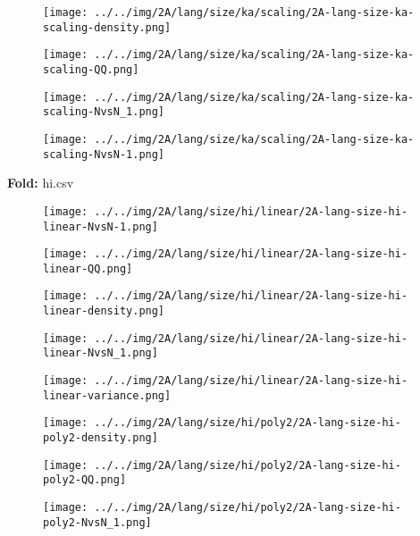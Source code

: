 \begin{figure}[H]
\centering	\texttt{[image: ../../img/2A/lang/size/ka/scaling/2A-lang-size-ka-scaling-density.png]}
\end{figure}
\begin{figure}[H]
\centering	\texttt{[image: ../../img/2A/lang/size/ka/scaling/2A-lang-size-ka-scaling-QQ.png]}
\end{figure}
\begin{figure}[H]
\centering	\texttt{[image: ../../img/2A/lang/size/ka/scaling/2A-lang-size-ka-scaling-NvsN\_1.png]}
\end{figure}
\begin{figure}[H]
\centering	\texttt{[image: ../../img/2A/lang/size/ka/scaling/2A-lang-size-ka-scaling-NvsN-1.png]}
\end{figure}
\textbf{Fold:} hi.csv
\begin{figure}[H]
\centering	\texttt{[image: ../../img/2A/lang/size/hi/linear/2A-lang-size-hi-linear-NvsN-1.png]}
\end{figure}
\begin{figure}[H]
\centering	\texttt{[image: ../../img/2A/lang/size/hi/linear/2A-lang-size-hi-linear-QQ.png]}
\end{figure}
\begin{figure}[H]
\centering	\texttt{[image: ../../img/2A/lang/size/hi/linear/2A-lang-size-hi-linear-density.png]}
\end{figure}
\begin{figure}[H]
\centering	\texttt{[image: ../../img/2A/lang/size/hi/linear/2A-lang-size-hi-linear-NvsN\_1.png]}
\end{figure}
\begin{figure}[H]
\centering	\texttt{[image: ../../img/2A/lang/size/hi/linear/2A-lang-size-hi-linear-variance.png]}
\end{figure}
\begin{figure}[H]
\centering	\texttt{[image: ../../img/2A/lang/size/hi/poly2/2A-lang-size-hi-poly2-density.png]}
\end{figure}
\begin{figure}[H]
\centering	\texttt{[image: ../../img/2A/lang/size/hi/poly2/2A-lang-size-hi-poly2-QQ.png]}
\end{figure}
\begin{figure}[H]
\centering	\texttt{[image: ../../img/2A/lang/size/hi/poly2/2A-lang-size-hi-poly2-NvsN\_1.png]}
\end{figure}
